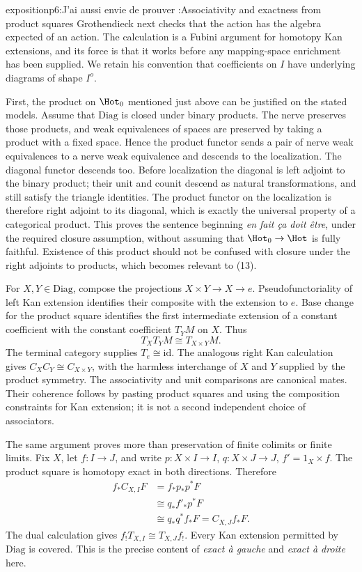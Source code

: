 \begin{dcomment}{exposition}{p6:J’ai aussi envie de prouver :}{Associativity and exactness from product squares}
Grothendieck next checks that the action has the algebra expected of an action. The calculation is a Fubini argument for homotopy Kan extensions, and its force is that it works before any mapping-space enrichment has been supplied. We retain his convention that coefficients on \(I\) have underlying diagrams of shape \(I^o\).

First, the product on \(\Hot_0\) mentioned just above can be justified on the stated models. Assume that \(\mathrm{Diag}\) is closed under binary products. The nerve preserves those products, and weak equivalences of spaces are preserved by taking a product with a fixed space. Hence the product functor sends a pair of nerve weak equivalences to a nerve weak equivalence and descends to the localization. The diagonal functor descends too. Before localization the diagonal is left adjoint to the binary product; their unit and counit descend as natural transformations, and still satisfy the triangle identities. The product functor on the localization is therefore right adjoint to its diagonal, which is exactly the universal property of a categorical product. This proves the sentence beginning \emph{en fait ça doit être}, under the required closure assumption, without assuming that \(\Hot_0\to\Hot\) is fully faithful. Existence of this product should not be confused with closure under the right adjoints to products, which becomes relevant to (13).

For \(X,Y\in\mathrm{Diag}\), compose the projections \(X\times Y\to X\to e\). Pseudofunctoriality of left Kan extension identifies their composite with the extension to \(e\). Base change for the product square identifies the first intermediate extension of a constant coefficient with the constant coefficient \(T_YM\) on \(X\). Thus
\[
 T_XT_YM\cong T_{X\times Y}M.
\]
The terminal category supplies \(T_e\cong\mathrm{id}\). The analogous right Kan calculation gives \(C_XC_Y\cong C_{X\times Y}\), with the harmless interchange of \(X\) and \(Y\) supplied by the product symmetry. The associativity and unit comparisons are canonical mates. Their coherence follows by pasting product squares and using the composition constraints for Kan extension; it is not a second independent choice of associators.

The same argument proves more than preservation of finite colimits or finite limits. Fix \(X\), let \(f:I\to J\), and write \(p:X\times I\to I\), \(q:X\times J\to J\), \(f'=1_X\times f\). The product square is homotopy exact in both directions. Therefore
\[
\begin{aligned}
 f_*C_{X,I}F
 &=f_*p_*p^*F\\
 &\cong q_*f'_*p^*F\\
 &\cong q_*q^*f_*F=C_{X,J}f_*F .
\end{aligned}
\]
The dual calculation gives \(f_!T_{X,I}\cong T_{X,J}f_!\). Every Kan extension permitted by \(\mathrm{Diag}\) is covered. This is the precise content of \emph{exact à gauche} and \emph{exact à droite} here.


\end{dcomment}
